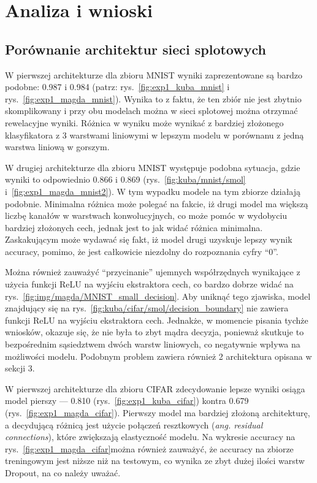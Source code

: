 \documentclass[10pt]{article}
\begin{document}
\pagebreak
\section{Analiza i wnioski}\label{sec:wyniki}
\subsection*{Porównanie architektur sieci splotowych}
W pierwszej architekturze dla zbioru MNIST wyniki zaprezentowane są bardzo podobne:
0.987 i 0.984 (patrz: rys.~\ref{fig:exp1_kuba_mnist} i rys.~\ref{fig:exp1_magda_mnist}).
Wynika to z faktu, że ten zbiór nie jest zbytnio skomplikowany i przy obu modelach można w sieci splotowej można otrzymać rewelacyjne wyniki.
Różnica w wyniku może wynikać z bardziej złożonego klasyfikatora z 3 warstwami liniowymi w lepszym modelu w porównanu z jedną warstwa liniową w gorszym.

W drugiej architekturze dla zbioru MNIST występuje podobna sytuacja, gdzie wyniki to odpowiednio 0.866 i 0.869 (rys.~\ref{fig:kuba/mnist/smol} i~\ref{fig:exp1_magda_mnist2}).
W tym wypadku modele na tym zbiorze działają podobnie.
Minimalna różnica może polegać na fakcie, iż drugi model ma większą liczbę kanałów w warstwach konwolucyjnych, co może pomóc w wydobyciu bardziej złożonych cech, jednak jest to jak widać różnica minimalna.
Zaskakującym może wydawać się fakt, iż model drugi uzyskuje lepszy wynik accuracy, pomimo, że jest całkowicie niezdolny do rozpoznania cyfry ``0''.

Można również zauważyć ``przycinanie'' ujemnych współrzędnych wynikające z użycia funkcji ReLU na wyjściu ekstraktora cech,
co bardzo dobrze widać na rys.~\ref{fig:img/magda/MNIST_small_decision}.
Aby uniknąć tego zjawiska, model znajdujący się na rys.~\ref{fig:kuba/cifar/smol/decision_boundary} nie zawiera funkcji ReLU na wyjściu ekstraktora cech.
Jednakże, w momencie pisania tychże wniosków, okazuje się, że nie była to zbyt mądra decyzja, ponieważ skutkuje to bezpośrednim sąsiedztwem dwóch warstw liniowych, co negatywnie wpływa na możliwości modelu.
Podobnym problem zawiera również 2 architektura opisana w sekcji 3.

W pierwszej architekturze dla zbioru CIFAR zdecydowanie lepsze wyniki osiąga model pierszy ---
0.810 (rys.~\ref{fig:exp1_kuba_cifar}) kontra 0.679 (rys.~\ref{fig:exp1_magda_cifar}).
Pierwszy model ma bardziej złożoną architekturę, a decydującą różnicą jest użycie połączeń resztkowych (\emph{ang. residual connections}), które zwiększają elastyczność modelu.
Na wykresie accuracy na rys.~\ref{fig:exp1_magda_cifar}można również zauważyć, że accuracy na zbiorze treningowym jest niższe niż na testowym, co wynika ze zbyt dużej ilości warstw Dropout, na co należy uważać.
\end{document}
